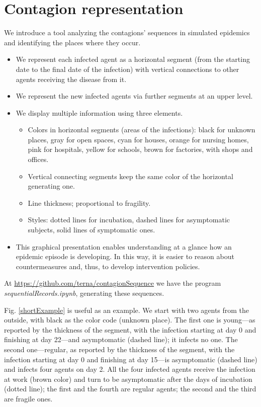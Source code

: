\documentclass[graybox]{svmult}
\begin{document}
\section{Contagion representation}
\label{contag}


We introduce a tool analyzing the contagions' sequences in simulated epidemics and identifying the places where they occur.


 \begin{itemize}
 \item
We represent each infected agent as a horizontal segment (from the starting date to the final date of the infection) with vertical connections to other agents receiving the disease from it.

 \item
We represent the new infected agents via further segments at an upper level. 

 \item
We display multiple information using three elements.
 \begin{itemize}
 \item Colors in horizontal segments (areas of the infections): black for unknown places, gray for open spaces, cyan for houses, orange for nursing homes, pink for hospitals, yellow for schools, brown for factories, with shops and offices.
 \item Vertical connecting segments keep the same color of the horizontal generating one. 
 \item Line thickness; proportional to fragility.
 \item Styles: dotted lines for incubation, dashed lines for asymptomatic subjects, solid lines of symptomatic ones.
 \end{itemize}
 \item
This graphical presentation enables understanding at a glance how an epidemic episode is developing. In this way, it is easier to reason about countermeasures and, thus, to develop intervention policies. 
 \end{itemize}

At \href{https://github.com/terna/contagionSequence}{https://github.com/terna/contagionSequence} we have the program \emph{sequentialRecords.ipynb}, generating these sequences.
 

Fig. \ref{shortExample} is useful as an example. 
We start with two agents from the outside, with black as the color code (unknown place). The first one is young---as reported by the thickness of the segment, with the infection starting at day 0 and finishing at day 22---and asymptomatic (dashed line); it infects no one. The second one---regular, as reported by the thickness of the segment, with the infection starting at day 0 and finishing at day 15---is asymptomatic (dashed line) and infects four agents on day 2. All the four infected agents receive the infection at work (brown color) and turn to be asymptomatic after the days of incubation (dotted line); the first and the fourth are regular agents; the second and the third are fragile ones.
\end{document}
